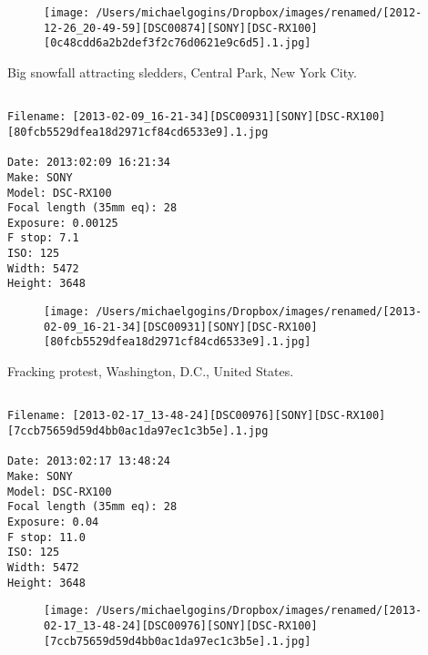 \begin{figure}
\texttt{[image: /Users/michaelgogins/Dropbox/images/renamed/[2012-12-26\_20-49-59][DSC00874][SONY][DSC-RX100][0c48cdd6a2b2def3f2c76d0621e9c6d5].1.jpg]}
\end{figure}
    
\clearpage
\onecolumn
\noindent Big snowfall attracting sledders, Central Park, New York City.
\noindent
\begin{lstlisting}

Filename: [2013-02-09_16-21-34][DSC00931][SONY][DSC-RX100][80fcb5529dfea18d2971cf84cd6533e9].1.jpg

Date: 2013:02:09 16:21:34
Make: SONY
Model: DSC-RX100
Focal length (35mm eq): 28
Exposure: 0.00125
F stop: 7.1
ISO: 125
Width: 5472
Height: 3648
\end{lstlisting}
\clearpage

\begin{figure}
\texttt{[image: /Users/michaelgogins/Dropbox/images/renamed/[2013-02-09\_16-21-34][DSC00931][SONY][DSC-RX100][80fcb5529dfea18d2971cf84cd6533e9].1.jpg]}
\end{figure}
    
\clearpage
\onecolumn
\noindent Fracking protest, Washington, D.C., United States.
\noindent
\begin{lstlisting}

Filename: [2013-02-17_13-48-24][DSC00976][SONY][DSC-RX100][7ccb75659d59d4bb0ac1da97ec1c3b5e].1.jpg

Date: 2013:02:17 13:48:24
Make: SONY
Model: DSC-RX100
Focal length (35mm eq): 28
Exposure: 0.04
F stop: 11.0
ISO: 125
Width: 5472
Height: 3648
\end{lstlisting}
\clearpage

\begin{figure}
\texttt{[image: /Users/michaelgogins/Dropbox/images/renamed/[2013-02-17\_13-48-24][DSC00976][SONY][DSC-RX100][7ccb75659d59d4bb0ac1da97ec1c3b5e].1.jpg]}
\end{figure}
    
